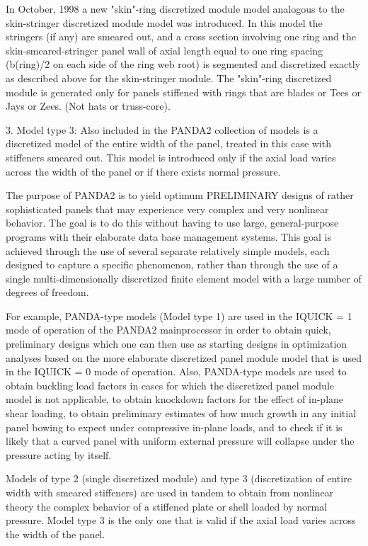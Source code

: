 In October, 1998 a new "skin"-ring discretized module model analogous
to the skin-stringer discretized module model was introduced. In this
model the stringers (if any) are smeared out, and a cross section
involving one ring and the skin-smeared-stringer panel wall of axial
length equal to one ring spacing (b(ring)/2 on each side of the ring
web root) is segmented and discretized exactly as described above for
the skin-stringer module. The "skin"-ring discretized module is generated
only for panels stiffened with rings that are blades or Tees or Jays or
Zees. (Not hats or truss-core).

3. Model type 3: Also included in the PANDA2 collection of models is a
discretized model of the entire width of the panel, treated in this case
with stiffeners smeared out. This model is introduced only if the axial
load varies across the width of the panel or if there exists normal
pressure. 

The purpose of PANDA2 is to yield optimum PRELIMINARY designs of rather
sophisticated panels that may experience very complex and very nonlinear
behavior. The goal is to do this without having to use large,
general-purpose programs with their elaborate data base management
systems.  This goal is achieved through the use of several separate
relatively simple models, each designed to capture a specific phenomenon,
rather than through the use of a single multi-dimensionally discretized
finite element model with a large number of degrees of freedom. 

For example, PANDA-type models (Model type 1) are used in the IQUICK = 1
mode of operation of the PANDA2 mainprocessor in order to obtain quick,
preliminary designs which one can then use as starting designs in
optimization analyses based on the more elaborate discretized panel module
model that is used in the IQUICK = 0 mode of operation. Also, PANDA-type
models are used to obtain buckling load factors in cases for which the
discretized panel module model is not applicable, to obtain knockdown
factors for the effect of in-plane shear loading, to obtain preliminary
estimates of how much growth in any initial panel bowing to expect under
compressive in-plane loads, and to check if it is likely that a curved
panel with uniform external pressure will collapse under the pressure
acting by itself. 

Models of type 2 (single discretized module) and type 3 (discretization of
entire width with smeared stiffeners) are used in tandem to obtain from
nonlinear theory the complex behavior of a stiffened plate or shell loaded
by normal pressure. Model type 3 is the only one that is valid if the
axial load varies across the width of the panel. 

